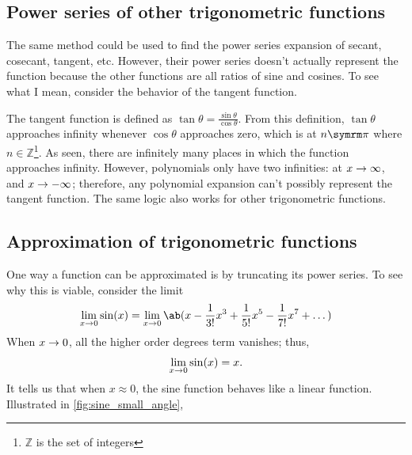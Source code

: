 \subsection{Power series of other trigonometric functions}

The same method could be used to find the power series expansion of secant, cosecant, tangent, etc. However, their power series doesn't actually represent the function because the other functions are all ratios of sine and cosines. To see what I mean, consider the behavior of the tangent function.

The tangent function is defined as $\tan\theta = \frac{\sin\theta}{\cos\theta}$. From this definition, $\tan\theta$ approaches infinity whenever $\cos\theta$ approaches zero, which is at $n\cpi$ where $n \in \mathbb{Z}$\footnote{$\mathbb{Z}$ is the set of integers}. As seen, there are infinitely many places in which the function approaches infinity. However, polynomials only have two infinities: at $x \rightarrow \infty$, and $x \rightarrow -\infty$; therefore, any polynomial expansion can't possibly represent the tangent function. The same logic also works for other trigonometric functions.

\subsection{Approximation of trigonometric functions}

One way a function can be approximated is by truncating its power series. To see why this is viable, consider the limit
\begin{align}
	\lim_{x \appr 0}\sin(x) = \lim_{x \appr 0}\ab(x - \frac{1}{3!}x^3 + \frac{1}{5!}x^5 - \frac{1}{7!}x^7 + \dots)
\end{align}
When $x \rightarrow 0$, all the higher order degrees term vanishes; thus, 
\begin{gather}
	\lim_{x \rightarrow 0}\sin(x) = x.
\end{gather}
It tells us that when $x \approx 0$, the sine function behaves like a linear function. Illustrated in \cref{fig:sine_small_angle},


